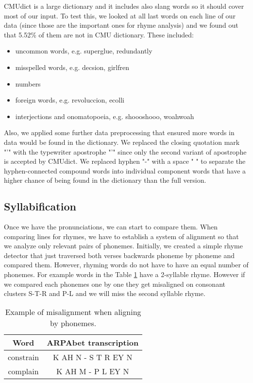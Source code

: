 CMUdict is a large dictionary and it includes also slang words so it should cover most of our input. To test this, we looked at all last words on each line of our data (since those are the important ones for rhyme analysis) and we found out that 5.52\% of them are not in CMU dictionary. These included:

\begin{itemize}
	\item uncommon words, e.g. superglue, redundantly
	\item misspelled words, e.g. decsion, girlfren
	\item numbers
	\item foreign words, e.g. revoluccion, ecolli
	\item interjections and onomatopoeia, e.g. shoooshooo, woahwoah
\end{itemize}

Also, we applied some further data preprocessing that ensured more words in data would be found in the dictionary. We replaced the closing quotation mark "’" with the typewriter apostrophe "'" since only the second variant of apostrophe is accepted by CMUdict. We replaced hyphen "-" with a space " " to separate the hyphen-connected compound words into individual component words that have a higher chance of being found in the dictionary than the full version.

\subsection{Syllabification}
Once we have the pronunciations, we can start to compare them. When comparing lines for rhymes, we have to establish a system of alignment so that we analyze only relevant pairs of phonemes. Initially, we created a simple rhyme detector that just traversed both verses backwards phoneme by phoneme and compared them. However, rhyming words do not have to have an equal number of phonemes. For example words in the Table \ref{phon_misalign_table} have a 2-syllable rhyme. However if we compared each phonemes one by one they get misaligned on consonant clusters S-T-R and P-L and we will miss the second syllable rhyme.

\begin{table}[h!]
	\centering
	\begin{tabular}{c c} 
		Word & ARPAbet transcription \\ [0.5ex] 
		\hline
		constrain & K AH N - S T R EY N \\ 
		complain & K AH M - P L EY N \\
	\end{tabular}
	\caption{Example of misalignment when aligning by phonemes.}
	\label{phon_misalign_table}
\end{table}

